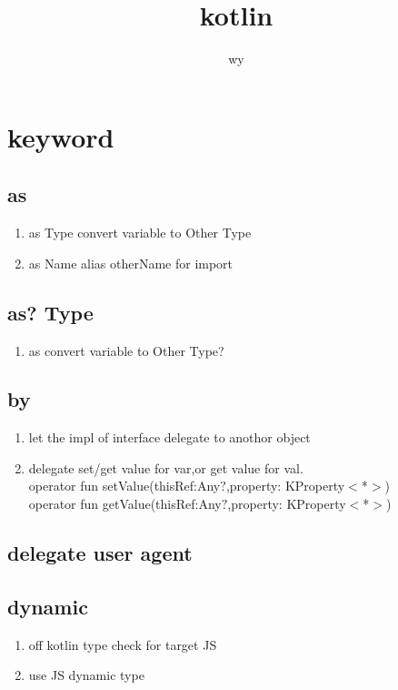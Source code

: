 \documentclass{article}
\begin{document}
\title{kotlin }
\author{wy}
\maketitle

\newpage
\tableofcontents
\newpage 

\section{keyword}
    \subsection{as}
         \begin{enumerate}
            \item as Type  convert variable to Other Type  
            \item as Name  alias otherName for import
         \end{enumerate}
    \subsection{as? Type}
         \begin{enumerate}
            \item as  convert variable to Other Type?  
         \end{enumerate}
    \subsection{by}
         \begin{enumerate}
             \item let the impl of interface delegate to anothor object
             \item delegate set/get value for var,or get value for val.\\
                 operator fun setValue(thisRef:Any$?$,property: KProperty$<$*$>$)\\
                 operator fun getValue(thisRef:Any$?$,property: KProperty$<$*$>$)   
         \end{enumerate}
    \subsection{delegate user agent}
    
    \subsection{dynamic} 
         \begin{enumerate}
             \item off kotlin type check for target JS
             \item use JS dynamic type
         \end{enumerate}
\newpage
\end{document}

